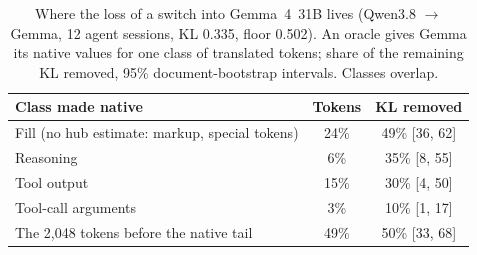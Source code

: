 \begin{table}[t]
\centering
\small
\caption{Where the loss of a switch into Gemma~4~31B lives (Qwen3.8 $\to$ Gemma, 12 agent sessions, KL
0.335, floor 0.502). An oracle gives Gemma its native values for one class of translated tokens; share of the
remaining KL removed, 95\% document-bootstrap intervals. Classes overlap.}
\label{tab:decompose}
\begin{tabular}{lcc}
\toprule
Class made native & Tokens & KL removed \\
\midrule
Fill (no hub estimate: markup, special tokens) & 24\% & 49\% [36, 62] \\
Reasoning & 6\% & 35\% [8, 55] \\
Tool output & 15\% & 30\% [4, 50] \\
Tool-call arguments & 3\% & 10\% [1, 17] \\
\midrule
The 2,048 tokens before the native tail & 49\% & 50\% [33, 68] \\
\bottomrule
\end{tabular}
\end{table}
